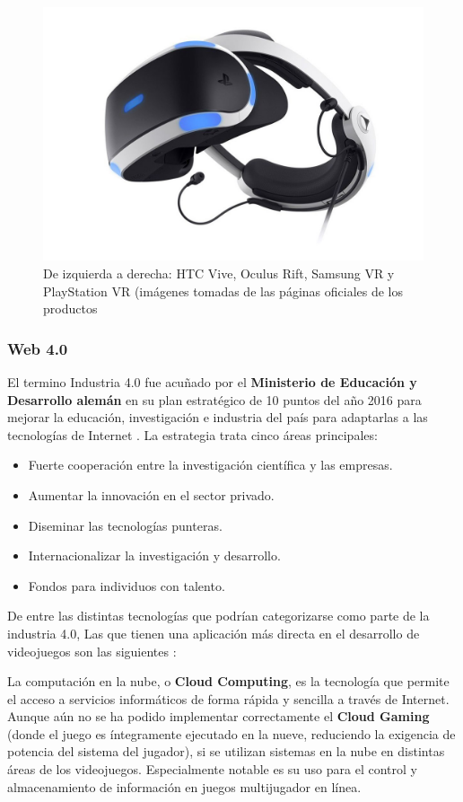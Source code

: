 \begin{figure}[!htb]
\begin {minipage}{0.24\textwidth}
   \end{minipage}
      \begin {minipage}{0.24\textwidth}
     \centering
     \includegraphics[width=0.7\linewidth, left]{images/estadodelarte/mercado/foto-sony-vr}
   \end{minipage}
   \caption{De izquierda a derecha: HTC Vive, Oculus Rift, Samsung VR y PlayStation VR (imágenes tomadas de las páginas oficiales de los productos}
	\label{fotos_vr}
\end{figure}

\subsubsection{Web 4.0}
El termino Industria 4.0 fue acuñado por el \textbf{Ministerio de Educación y Desarrollo alemán} en su plan estratégico de 10 puntos del año 2016 para mejorar la educación, investigación e industria del país para adaptarlas a las tecnologías de Internet \cite{web_4_0}. La estrategia trata cinco áreas principales:
\begin{itemize}
\item Fuerte cooperación entre la investigación científica y las empresas.
\item Aumentar la innovación en el sector privado.
\item Diseminar las tecnologías punteras.
\item Internacionalizar la investigación y desarrollo.
\item Fondos para individuos con talento.
\end{itemize}

De entre las distintas tecnologías que podrían categorizarse como parte de la industria 4.0, Las que tienen una aplicación más directa en el desarrollo de videojuegos son las siguientes \cite{libro_blanco}:

La computación en la nube, o \textbf{Cloud Computing}, es la tecnología que permite el acceso a servicios informáticos de forma rápida y sencilla a través de Internet. Aunque aún no se ha podido implementar correctamente el \textbf{Cloud Gaming} (donde el juego es íntegramente ejecutado en la nueve, reduciendo la exigencia de potencia del sistema del jugador), si se utilizan sistemas en la nube en distintas áreas de los videojuegos. Especialmente notable es su uso para el control y almacenamiento de información en juegos multijugador en línea.

